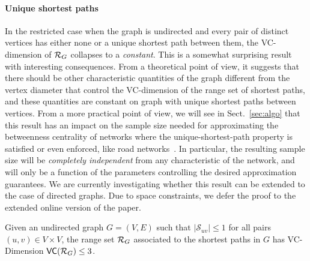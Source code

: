 \paragraph{Unique shortest paths}\label{sec:rangeunique}
In the restricted case when the graph is undirected and
every pair of distinct vertices has either none or a unique shortest path
between them, the VC-dimension of $\mathcal{R}_G$ collapses to a \emph{constant}. This is a
somewhat surprising result with interesting consequences. From a theoretical
point of view, it suggests that there should be other characteristic
quantities of the graph different from the vertex diameter that control the
VC-dimension of the range set of shortest paths, and these quantities are
constant on graph with unique shortest paths between vertices. From a more
practical point of view, we will see in Sect.~\ref{sec:algo} that this result has an
impact on the sample size needed for approximating the betweenness centrality of
networks where the unique-shortest-path property is satisfied or even enforced,
like road networks~\citep{GeisbergerSS08}. In particular, the resulting sample
size will be \emph{completely independent} from any characteristic of the
network, and will only be a function of the parameters controlling the desired
approximation guarantees. We are currently investigating whether this result can
be extended to the case of directed graphs.
\ifproof
\else
Due to space constraints, we defer the proof to the extended online version of
the paper.
\fi

\begin{lemma}\label{lem:vcdimuppboundunique}
  Given an undirected
  graph $G=(V,E)$ such that $|\mathcal{S}_{uv}|\le1$ for all
  pairs $(u,v)\in V\times V$, the range set $\mathcal{R}_G$ associated to the
  shortest paths in $G$ has VC-Dimension $\mathsf{VC}(\mathcal{R}_G)\le3$.
\end{lemma}

